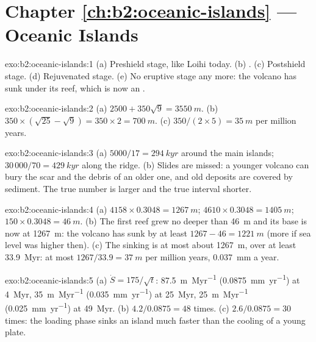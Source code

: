 \section*{Chapter \ref{ch:b2:oceanic-islands} --- Oceanic Islands}

\begin{solution}{exo:b2:oceanic-islands:1}
(a) Preshield stage, like Loihi today. (b) . (c) Postshield stage. (d) Rejuvenated
stage. (e) No eruptive stage any more: the volcano has sunk under its reef, which is now an .
\end{solution}

\begin{solution}{exo:b2:oceanic-islands:2}
(a) $2500 + 350\sqrt9 = \qty{3550}{m}$. (b) $350\times(\sqrt{25} - \sqrt9) = 350\times2 =
\qty{700}{m}$. (c) $350/(2\times5) = \qty{35}{m}$ per million years.
\end{solution}

\begin{solution}{exo:b2:oceanic-islands:3}
(a) $5000/17 = \qty{294}{kyr}$ around the main islands; $30\,000/70 = \qty{429}{kyr}$ along the
ridge. (b) Slides are missed: a younger volcano can bury the scar and the debris of an older one,
and old deposits are covered by sediment. The true number is larger and the true interval
shorter.
\end{solution}

\begin{solution}{exo:b2:oceanic-islands:4}
(a) $4158\times0.3048 = \qty{1267}{m}$; $4610\times0.3048 = \qty{1405}{m}$; $150\times0.3048 =
\qty{46}{m}$. (b) The first reef grew no deeper than \qty{46}{m} and its base is now at
\qty{1267}{m}: the volcano has sunk by at least $1267 - 46 = \qty{1221}{m}$ (more if sea level
was higher then). (c) The sinking is at most about \qty{1267}{m}, over at least \qty{33.9}{Myr}:
at most $1267/33.9 = \qty{37}{m}$ per million years, \qty{0.037}{mm} a year.
\end{solution}

\begin{solution}{exo:b2:oceanic-islands:5}
(a) $\dot S = 175/\sqrt t$: \qty{87.5}{m.Myr^{-1}} (\qty{0.0875}{mm.yr^{-1}}) at \qty{4}{Myr},
\qty{35}{m.Myr^{-1}} (\qty{0.035}{mm.yr^{-1}}) at \qty{25}{Myr}, \qty{25}{m.Myr^{-1}}
(\qty{0.025}{mm.yr^{-1}}) at \qty{49}{Myr}. (b) $4.2/0.0875 = 48$ times. (c) $2.6/0.0875 = 30$
times: the loading phase sinks an island much faster than the cooling of a young plate.
\end{solution}

